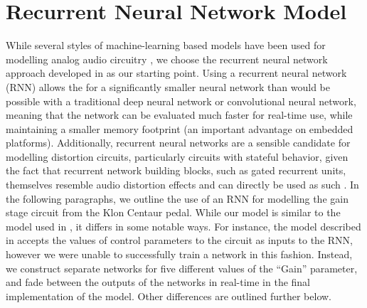 \documentclass[twoside,a4paper]{article}
\begin{document}
\section{Recurrent Neural Network Model}
While several styles of machine-learning based models have been used for
modelling analog audio circuitry \cite{WaveNetVA,NLML,MartinezReissDNN},
we choose the recurrent neural network approach developed in \cite{VArnn}
as our starting point. Using a recurrent neural network (RNN) allows the for a
significantly smaller neural network than would be possible with a traditional
deep neural network or convolutional neural network, meaning that the network
can be evaluated much faster for real-time use, while maintaining a smaller
memory footprint (an important advantage on embedded platforms). Additionally,
recurrent neural networks are a sensible candidate for modelling distortion
circuits, particularly circuits with stateful behavior, given the fact that
recurrent network building blocks, such as gated recurrent units, themselves
resemble audio distortion effects and can directly be used as such
\cite{chowdhury:complexNL:2020}.
\newline\newline
In the following paragraphs, we outline the use of an RNN for modelling
the gain stage circuit from the Klon Centaur pedal. While our model
is similar to the model used in \cite{VArnn}, it differs in some
notable ways. For instance, the model described in \cite{VArnn} accepts
the values of control parameters to the circuit as inputs to the RNN,
however we were unable to successfully train a network in this fashion.
Instead, we construct separate networks for five different values of the
``Gain'' parameter, and fade between the outputs of the networks in
real-time in the final implementation of the model. Other differences are
outlined further below.
\end{document}
